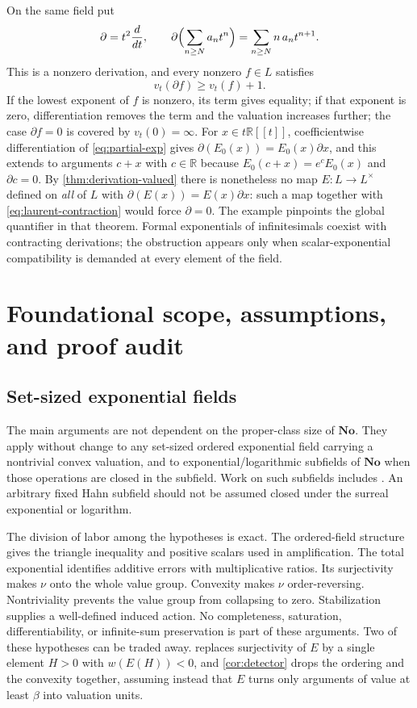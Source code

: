 \documentclass[11pt]{article}
\theoremstyle{definition}
\theoremstyle{remark}
\newcommand{\No}{\mathbf{No}}
\newcommand{\R}{\mathbb{R}}
\numberwithin{equation}{section}
\begin{document}
On the same field put
\begin{equation}\label{eq:laurent-derivation}
 \partial=t^{2}\frac{d}{dt},\qquad
 \partial\Bigl(\sum_{n\ge N}a_nt^{n}\Bigr)=\sum_{n\ge N}n\,a_n t^{n+1}.
\end{equation}
This is a nonzero derivation, and every nonzero $f\in L$ satisfies
\begin{equation}\label{eq:laurent-contraction}
 v_t(\partial f)\ge v_t(f)+1 .
\end{equation}
If the lowest exponent of $f$ is nonzero, its term gives equality; if that
exponent is zero, differentiation removes the term and the valuation
increases further; the case $\partial f=0$ is covered by $v_t(0)=\infty$.
For $x\in t\R[[t]]$, coefficientwise differentiation of \eqref{eq:partial-exp}
gives $\partial(E_0(x))=E_0(x)\partial x$, and this extends to arguments
$c+x$ with $c\in\R$ because $E_0(c+x)=e^{c}E_0(x)$ and $\partial c=0$.
By \cref{thm:derivation-valued} there is nonetheless no map
$E:L\to L^{\times}$ defined on \emph{all} of $L$ with
$\partial(E(x))=E(x)\partial x$: such a map together with
\eqref{eq:laurent-contraction} would force $\partial=0$. The example
pinpoints the global quantifier in that theorem. Formal exponentials of
infinitesimals coexist with contracting derivations; the obstruction
appears only when scalar-exponential compatibility is demanded at every
element of the field.


\section{Foundational scope, assumptions, and proof audit}

\subsection{Set-sized exponential fields}

The main arguments are not dependent on the proper-class size of $\No$.
They apply without change to any set-sized ordered exponential field
carrying a nontrivial convex valuation, and to exponential/logarithmic
subfields of $\No$ when those operations are closed in the subfield.
Work on such subfields includes \cite{EhrlichKaplan,BournezGuilmant}.
An arbitrary fixed Hahn subfield should not be assumed closed under the
surreal exponential or logarithm.

The division of labor among the hypotheses is exact.
The ordered-field structure gives the triangle inequality and positive
scalars used in amplification. The total exponential identifies additive
errors with multiplicative ratios. Its surjectivity makes $\nu$ onto the
whole value group. Convexity makes $\nu$ order-reversing. Nontriviality
prevents the value group from collapsing to zero. Stabilization supplies a
well-defined induced action. No completeness, saturation, differentiability,
or infinite-sum preservation is part of these arguments.
Two of these hypotheses can be traded away.  replaces
surjectivity of $E$ by a single element $H>0$ with $w(E(H))<0$, and
\cref{cor:detector} drops the ordering and the convexity together, assuming
instead that $E$ turns only arguments of value at least $\beta$ into
valuation units.
\end{document}

